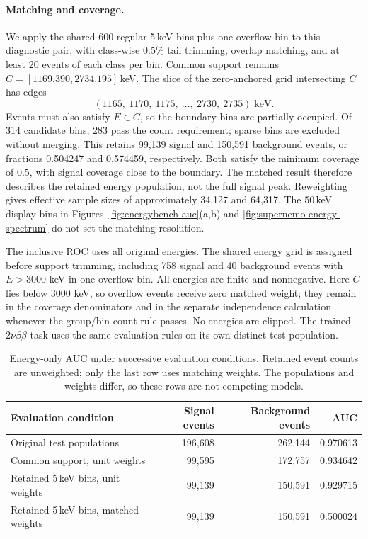 \paragraph{Matching and coverage.}
We apply the shared 600 regular 5\,keV bins plus one overflow bin to this
diagnostic pair, with
class-wise 0.5\% tail trimming, overlap matching, and at least 20 events
of each class per bin. Common support remains
$C=[1169.390,2734.195]$\,keV. The slice of the zero-anchored grid
intersecting $C$ has edges
\begin{equation}
 (1165,\ 1170,\ 1175,\ \ldots,\ 2730,\ 2735)
 \;\mathrm{keV}.
\end{equation}
Events must also satisfy $E\in C$, so the boundary bins are partially
occupied. Of 314 candidate bins, 283 pass the count requirement; sparse
bins are excluded without merging. This retains 99,139 signal and
150,591 background events, or fractions 0.504247 and 0.574459, respectively.
Both satisfy the minimum coverage of 0.5, with signal coverage close to
the boundary. The matched result therefore describes the retained energy
population, not the full signal peak. Reweighting gives effective sample
sizes of approximately 34,127 and 64,317. The 50\,keV display bins in
Figures~\ref{fig:energybench-auc}(a,b) and
\ref{fig:supernemo-energy-spectrum} do not set the matching resolution.

The inclusive ROC uses all original energies. The shared energy grid is
assigned before support trimming, including 758 signal and 40 background
events with $E>3000$ keV in one overflow bin. All energies are finite and
nonnegative. Here $C$ lies below 3000 keV, so overflow events receive zero
matched weight; they remain in the coverage denominators and in the
separate independence calculation whenever the group/bin count rule passes.
No energies are clipped. The trained $2\nu\beta\beta$ task uses the same
evaluation rules on its own distinct test population.

\begin{table}[h]
\centering
\small
\caption{Energy-only AUC under successive evaluation conditions. Retained
event counts are unweighted; only the last row uses matching weights.
The populations and weights differ, so these rows are not competing models.}
\label{tab:energy-only-stages}
\begin{tabular}{lrrr}
\toprule
Evaluation condition & Signal events & Background events & AUC \\
\midrule
Original test populations & 196,608 & 262,144 & 0.970613 \\
Common support, unit weights & 99,595 & 172,757 & 0.934642 \\
Retained 5\,keV bins, unit weights & 99,139 & 150,591 & 0.929715 \\
Retained 5\,keV bins, matched weights & 99,139 & 150,591 & 0.500024 \\
\bottomrule
\end{tabular}
\end{table}

